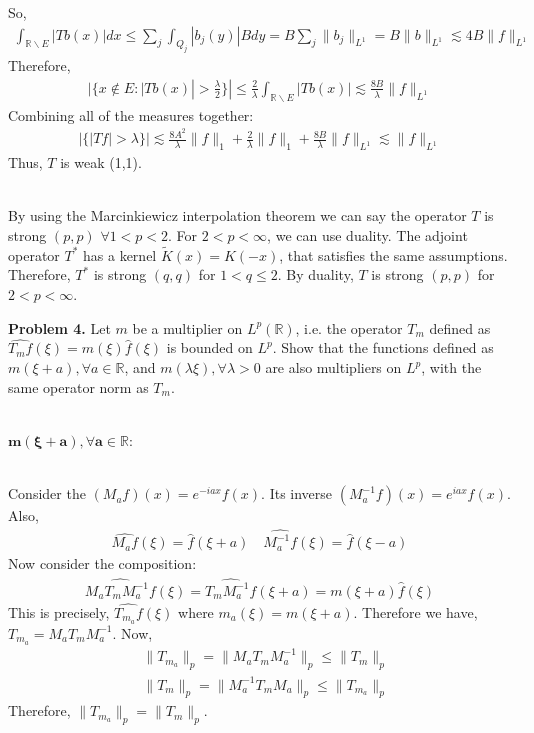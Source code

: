 \documentclass{article}
\newcommand{\R}{\mathbb{R}}
\begin{document}
So,
\begin{align*}
    \int_{\R \backslash E} |Tb(x)|dx \leq \sum_j \int_{Q_j} |b_j(y)| Bdy = B \sum_j \lVert b_j \rVert_{L^1} = B\lVert b \rVert_{L^1} \lesssim 4B \lVert f \rVert_{L^1}
\end{align*}
Therefore,
\begin{align*}
    |\{x\notin E: |Tb(x)| > \frac{\lambda}{2}\}| \leq \frac{2}{\lambda} \int_{\R\backslash E} |Tb(x)| \lesssim \frac{8B}{\lambda} \lVert f \rVert_{L^1}
\end{align*}
Combining all of the measures together:
\begin{align*}
    |\{|Tf| > \lambda\}| \lesssim \frac{8A^2}{\lambda} \lVert f \rVert_1 + \frac{2}{\lambda} \lVert f \rVert_1 + \frac{8B}{\lambda} \lVert f \rVert_{L^1} \lesssim \lVert f \rVert_{L^1}
\end{align*}
Thus, $T$ is weak (1,1).
\\~


By using the Marcinkiewicz interpolation theorem we can say the operator $T$ is strong $(p,p)$ $\forall 1 < p < 2$. For $2 < p < \infty$, we can use duality. The adjoint operator $T^*$ has a kernel $\tilde{K}(x) = K(-x)$, that satisfies the same assumptions. Therefore, $T^*$ is strong $(q,q)$ for $1 < q \leq 2$. By duality, $T$ is strong $(p,p)$ for $2 < p < \infty$.

\clearpage



\textbf{Problem 4. } Let $m$ be a multiplier on $L^p(\R)$, i.e. the operator $T_m$ defined as $\widehat{T_m f}(\xi) = m(\xi)\hat{f}(\xi)$ is bounded on $L^p$. Show that the functions defined as $m(\xi + a), \forall a \in \R$, and $m(\lambda\xi), \forall \lambda > 0$ are also multipliers on $L^p$, with the same operator norm as $T_m$.
\\~

$\boldsymbol{m(\xi + a), \forall a \in \R}$:
\\~

Consider the $(M_af)(x) = e^{-iax}f(x)$. Its inverse $(M_a^{-1}f)(x) = e^{iax}f(x)$. Also,
\begin{gather*}
    \widehat{M_af}(\xi) = \hat{f}(\xi + a) \quad \widehat{M_a^{-1}f}(\xi) = \hat{f}(\xi - a)
\end{gather*}
Now consider the composition:
\begin{align*}
    \widehat{M_aT_mM_a^{-1}f}(\xi) = \widehat{T_mM_a^{-1}f}(\xi + a) = m(\xi+a)\hat{f}(\xi)
\end{align*}
This is precisely, $\widehat{T_{m_a}f}(\xi)$ where $m_a(\xi) = m(\xi + a)$. Therefore we have, $T_{m_a} = M_a T_m M_a^{-1}$. Now, 
\begin{align*}
    &\lVert T_{m_a} \rVert_p = \lVert  M_a T_m M_a^{-1} \rVert_p \leq \lVert T_{m} \rVert_p\\
    &\lVert T_{m} \rVert_p = \lVert  M_a^{-1} T_m M_a \rVert_p \leq \lVert T_{m_a} \rVert_p
\end{align*}
Therefore, $\lVert T_{m_a} \rVert_p = \lVert T_{m} \rVert_p$.
\\~
\end{document}
